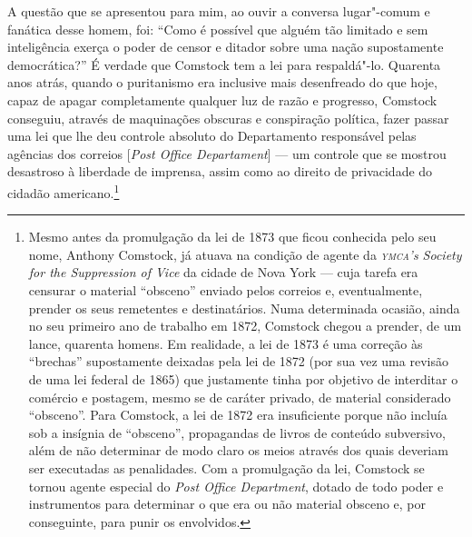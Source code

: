A questão que se apresentou para mim, ao ouvir a conversa lugar"-comum e
fanática desse homem, foi: ``Como é possível que alguém tão limitado e
sem inteligência exerça o poder de censor e ditador sobre uma nação
supostamente democrática?'' É verdade que Comstock tem a lei para
respaldá"-lo. Quarenta anos atrás, quando o puritanismo era inclusive
mais desenfreado do que hoje, capaz de apagar completamente qualquer luz
de razão e progresso, Comstock conseguiu, através de maquinações
obscuras e conspiração política, fazer passar uma lei que lhe deu
controle absoluto do Departamento responsável pelas agências dos
correios {[}\emph{Post Office Departament}{]} --- um controle que se
mostrou desastroso à liberdade de imprensa, assim como ao direito de
privacidade do cidadão americano.\footnote{Mesmo antes da promulgação da
  lei de 1873 que ficou conhecida pelo seu nome, Anthony Comstock, já
  atuava na condição de agente da \emph{\textsc{ymca}'s Society for the
  Suppression of Vice} da cidade de Nova York --- cuja tarefa era
  censurar o material ``obsceno'' enviado pelos correios e,
  eventualmente, prender os seus remetentes e destinatários. Numa
  determinada ocasião, ainda no seu primeiro ano de trabalho em 1872,
  Comstock chegou a prender, de um lance, quarenta homens. Em realidade,
  a lei de 1873 é uma correção às ``brechas'' supostamente deixadas pela
  lei de 1872 (por sua vez uma revisão de uma lei federal de 1865) que
  justamente tinha por objetivo de interditar o comércio e postagem,
  mesmo se de caráter privado, de material considerado ``obsceno''. Para
  Comstock, a lei de 1872 era insuficiente porque não incluía sob a
  insígnia de ``obsceno'', propagandas de livros de conteúdo subversivo,
  além de não determinar de modo claro os meios através dos quais
  deveriam ser executadas as penalidades. Com a promulgação da lei,
  Comstock se tornou agente especial do \emph{Post Office Department},
  dotado de todo poder e instrumentos para determinar o que era ou não
  material obsceno e, por conseguinte, para punir os envolvidos.}


